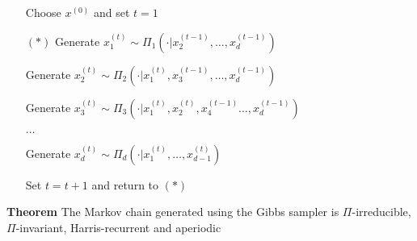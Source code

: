 \documentclass[notes,professionalfont,11pt,usenames,dvipsnames]{beamer}
\newcommand\justify{\rightskip0pt \leftskip0pt}
\newenvironment{slide}
{\begin{frame}[environment=slide]
\frametitle{\insertsection \\ \insertsubsection}\justify\setlength{\parskip}{0.5cm}\vspace{-0.5cm}}
{\end{frame}}
\begin{document}
\begin{slide}

\begin{itemize}
\item[] Choose $x^{(0)}$ and set $t=1$
\item[\color{black} $(*)$] Generate $x_1^{(t)}\sim \Pi_1(\cdot|x_2^{(t-1)},\ldots,x_d^{(t-1)})$ 
\item[] Generate $x_2^{(t)}\sim \Pi_2(\cdot|x_1^{(t)},x_3^{(t-1)},\ldots,x_d^{(t-1)})$
\item[] Generate $x_3^{(t)}\sim \Pi_3(\cdot|x_1^{(t)},x_2^{(t)},x_4^{(t-1)}\ldots,x_d^{(t-1)})$
\item[] $\ldots$ 
\item[] Generate $x_d^{(t)}\sim \Pi_d(\cdot|x_1^{(t)},\ldots,x_{d-1}^{(t)})$
\item[] Set $t=t+1$ and return to $(*)$
\end{itemize}


{\bf Theorem} The Markov chain generated using the Gibbs sampler is $\Pi$-irreducible, $\Pi$-invariant, 
Harris-recurrent and aperiodic

\label{lastslide}

\end{slide}
\end{document}
